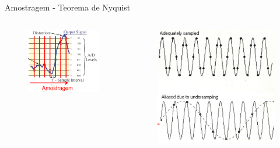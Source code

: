 \documentclass[aspectratio=169,
				xcolor=table]{beamer}
\begin{document}
	\begin{frame}{Amostragem - Teorema de Nyquist}
		\vspace{-2em}	
		\begin{columns}[t]
			\begin{column}{0.25\textwidth}	
				\begin{figure}[hbtp]
					\centering
					\includegraphics[width=\textwidth, keepaspectratio]{../figs/cap01/ad02.png}
				\end{figure}
				
			\end{column}
			\begin{column}{0.7\textwidth}	
		\begin{figure}[hbtp]
			\includegraphics[width=.7\textwidth, keepaspectratio]{../figs/cap01/nyquist.png}
		\end{figure}
				
			\end{column}
		\end{columns}
	\end{frame}
	
\end{document}
